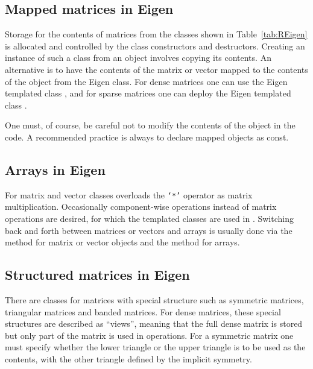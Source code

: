 \documentclass[shortnames,article]{jss}
\newcommand{\hlkwb}[1]{\textcolor[rgb]{0.13,0.54,0.13}{#1}}
\begin{document}
\subsection{Mapped matrices in Eigen}
\label{sec:mapped}

Storage for the contents of matrices from the classes shown in
Table~\ref{tab:REigen} is allocated and controlled by the class
constructors and destructors.  Creating an instance of such a class
from an  object involves copying its contents.  An
alternative is to have the contents of the  matrix or
vector mapped to the contents of the object from the Eigen class.  For
dense matrices one can use the Eigen templated class , and for
sparse matrices one can deploy the Eigen templated class .

One must, of course, be careful not to modify the contents of the
 object in the  code.  A recommended
practice is always to declare mapped objects as {\ttfamily\hlkwb{const}\normalfont}.

\subsection{Arrays in Eigen}
\label{sec:arrays}

For matrix and vector classes  overloads the \texttt{`*'}
operator as matrix multiplication.  Occasionally component-wise
operations instead of matrix operations are desired, for which the
 templated classes are used in .  Switching
back and forth between matrices or vectors and arrays is usually done
via the  method for matrix or vector objects and the
 method for arrays.

\subsection{Structured matrices in Eigen}
\label{sec:structured}

There are  classes for matrices with special structure such
as symmetric matrices, triangular matrices and banded matrices.  For
dense matrices, these special structures are described as ``views'',
meaning that the full dense matrix is stored but only part of the
matrix is used in operations.  For a symmetric matrix one must
specify whether the lower triangle or the upper triangle is to be used as
the contents, with the other triangle defined by the implicit symmetry.
\end{document}
